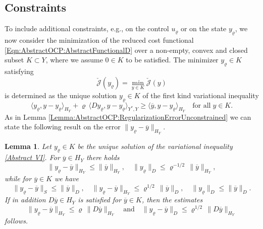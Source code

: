 \documentclass{article}
\newtheorem{lemma}{Lemma}
\numberwithin{equation}{section}
\begin{document}
\subsection{Constraints}
\label{Subsection:AbstractOCP:Constraints}
To include additional constraints, e.g., on the control $u_\varrho$ or on
the state $y_\varrho$, we now consider the minimization of the reduced cost
functional \eqref{Eqn:AbstractOCP:AbstractFunctionalD} over a non-empty,
convex and closed subset $K \subset Y$, where we assume $0 \in K$ to
be satisfied. The minimizer $y_\varrho \in K$ satisfying
\[
  \check{\mathcal{J}}(y_\varrho) = \min\limits_{y \in K}
  \check{\mathcal{J}}(y) 
\]
is determined as the unique solution $y_\varrho \in K$ of the first
kind variational inequality
\begin{equation}\label{Abstract VI}
  \langle y_\varrho , y - y_\varrho \rangle_{H_Y} +
  \varrho \, \langle D y_\varrho , y - y_\varrho \rangle_{Y^*,Y} \geq
  \langle \overline{y} , y - y_\varrho \rangle_{H_Y} \quad
  \mbox{for all} \; y \in K .
\end{equation}
As in Lemma \ref{Lemma:AbstractOCP:RegularizationErrorUnconstrained}
 we can state the following result on the error
$\| y_\varrho - \overline{y} \|_{H_Y}$. 

\begin{lemma}\label{Lemma regularization error state constraint}
  Let $y_\varrho \in K$ be the unique solution of the variational inequality
  \eqref{Abstract VI}. For $\overline{y} \in H_Y$ there holds
  \[
    \| y_\varrho - \overline{y} \|_{H_Y} \leq
    \| \overline{y} \|_{H_Y}, \quad
    \| y_\varrho \|_D \leq \varrho^{-1/2} \, \| \overline{y} \|_{H_Y} ,
  \]
  while for $\overline{y} \in K$ we have
    \[
    \| y_\varrho - \overline{y} \|_S \leq \| \overline{y} \|_D, \quad
    \| y_\varrho - \overline{y} \|_{H_Y} \leq \varrho^{1/2} \,
    \| \overline{y} \|_D , \quad
    \| y_\varrho \|_D \leq \| \overline{y} \|_D .
  \]
  If in addition $D \overline{y} \in H_Y$ is satisfied for
  $\overline{y} \in K$, then the estimates 
  \[
    \| y_\varrho - \overline{y} \|_{H_Y} \leq \varrho \,
    \| D \overline{y} \|_{H_Y} \quad \mbox{and} \quad
    \| y_\varrho - \overline{y} \|_D \leq
    \varrho^{1/2} \, \| D \overline{y} \|_{H_Y} 
  \]
  follows.
\end{lemma}
\end{document}
